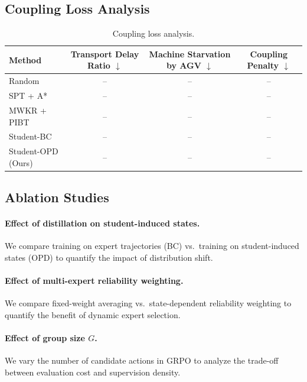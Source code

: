 \documentclass[11pt,a4paper]{article}
\begin{document}
\subsection{Coupling Loss Analysis}

\begin{table}[htbp]
    \centering
    \caption{Coupling loss analysis.}
    \label{tab:coupling}
    \begin{tabular}{lccc}
        \toprule
        \textbf{Method} & \textbf{Transport Delay Ratio} $\downarrow$ & \textbf{Machine Starvation by AGV} $\downarrow$ & \textbf{Coupling Penalty} $\downarrow$ \\
        \midrule
        Random           & -- & -- & -- \\
        SPT + A*         & -- & -- & -- \\
        MWKR + PIBT      & -- & -- & -- \\
        Student-BC       & -- & -- & -- \\
        Student-OPD (Ours) & -- & -- & -- \\
        \bottomrule
    \end{tabular}
\end{table}

\subsection{Ablation Studies}

\paragraph{Effect of distillation on student-induced states.}
We compare training on expert trajectories (BC) vs.\ training on student-induced states (OPD) to quantify the impact of distribution shift.

\paragraph{Effect of multi-expert reliability weighting.}
We compare fixed-weight averaging vs.\ state-dependent reliability weighting to quantify the benefit of dynamic expert selection.

\paragraph{Effect of group size $G$.}
We vary the number of candidate actions in GRPO to analyze the trade-off between evaluation cost and supervision density.
\end{document}
